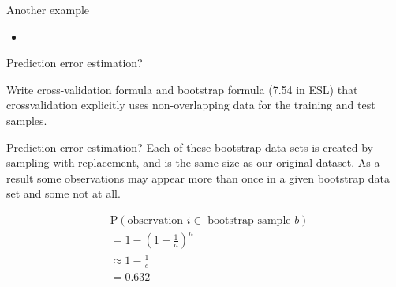 \documentclass[14pt]{beamer}
\begin{document}
\begin{frame}[plain]{Another example}

\begin{itemize}
	\item
\end{itemize}
\end{frame}



\begin{frame}[plain]{Prediction error estimation?}

Write cross-validation formula and bootstrap formula (7.54 in ESL)
that crossvalidation
explicitly uses non-overlapping data for the training and test
samples.

\end{frame}

\begin{frame}[plain]{Prediction error estimation?}
%
Each of these bootstrap data sets is created by sampling with replacement, and is the same size as our original dataset. As a result some observations may appear more than once in a given bootstrap data set and some not at all.

\begin{align*}
	&\text{P}(\text{observation~} i \in \text{~bootstrap sample~} b) \\
	&= 1 - (1 - \frac1n)^n \\
	&\approx 1 - \frac1e \\
	&= 0.632
\end{align*}

\end{frame}


\end{document}
